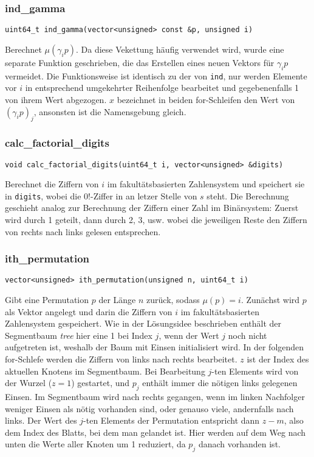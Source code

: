 \documentclass[a4paper, 10pt, ngerman]{article}
\begin{document}
\subsubsection{ind\_gamma}
\verb|uint64_t ind_gamma(vector<unsigned> const &p, unsigned i)|
\medskip

\noindent Berechnet $\mu(\gamma_i p)$. Da diese Vekettung häufig verwendet wird, wurde eine separate Funktion geschrieben, die das Erstellen eines neuen Vektors für $\gamma_i p$ vermeidet. Die Funktionsweise ist identisch zu der von \verb|ind|, nur werden Elemente vor $i$ in entsprechend umgekehrter Reihenfolge bearbeitet und gegebenenfalls 1 von ihrem Wert abgezogen. $x$ bezeichnet in beiden for-Schleifen den Wert von $(\gamma_i p)_j$, ansonsten ist die Namensgebung gleich.

\subsubsection{calc\_factorial\_digits}
\verb|void calc_factorial_digits(uint64_t i, vector<unsigned> &digits)|
\medskip

\noindent Berechnet die Ziffern von $i$ im fakultätsbasierten Zahlensystem und speichert sie in \verb|digits|, wobei die $0!$-Ziffer in an letzer Stelle von $s$ steht. Die Berechnung geschieht analog zur Berechnung der Ziffern einer Zahl im Binärsystem: Zuerst wird durch 1 geteilt, dann durch 2, 3, usw. wobei die jeweiligen Reste den Ziffern von rechts nach links gelesen entsprechen.

\subsubsection{ith\_permutation}
\verb|vector<unsigned> ith_permutation(unsigned n, uint64_t i)|
\medskip

\noindent Gibt eine Permutation $p$ der Länge $n$ zurück, sodass $\mu(p) = i$. Zunächst wird $p$ als Vektor angelegt und darin die Ziffern von $i$ im fakultätsbasierten Zahlensystem gespeichert. Wie in der Lösungsidee beschrieben enthält der Segmentbaum \emph{tree} hier eine 1 bei Index $j$, wenn der Wert $j$ noch nicht aufgetreten ist, weshalb der Baum mit Einsen initialisiert wird. In der folgenden for-Schlefe werden die Ziffern von links nach rechts bearbeitet. $z$ ist der Index des aktuellen Knotens im Segmentbaum. Bei Bearbeitung $j$-ten Elements wird von der Wurzel ($z = 1$) gestartet, und $p_j$ enthält immer die nötigen links gelegenen Einsen. Im Segmentbaum wird nach rechts gegangen, wenn im linken Nachfolger weniger Einsen als nötig vorhanden sind, oder genauso viele, andernfalls nach links. Der Wert des $j$-ten Elements der Permutation entspricht dann $z - m$, also dem Index des Blatts, bei dem man gelandet ist. Hier werden auf dem Weg nach unten die Werte aller Knoten um 1 reduziert, da $p_j$ danach vorhanden ist.
\end{document}

